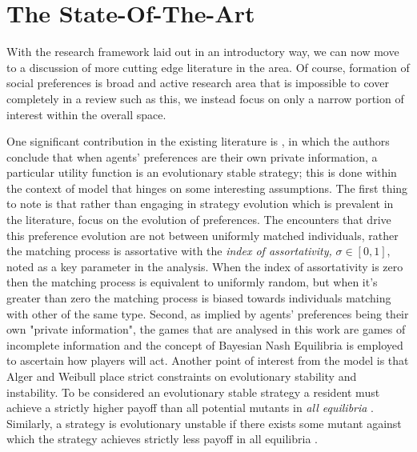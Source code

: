 \documentclass[11pt]{article}
\newcommand*{\np}{\par\noindent\newline}
\begin{document}
\section{The State-Of-The-Art}
With the research framework laid out in an introductory way, we can now move to a discussion of more cutting edge
literature in the area. Of course, formation of social preferences is broad and active research area that is impossible
to cover completely in a review such as this, we instead focus on only a narrow portion of interest within the overall space.

\np One significant contribution in the existing literature is \citet{alger_homo_2013}, in which the authors conclude
that when agents' preferences are their own private information, a particular utility function is an evolutionary stable
strategy; this is done within the context of model that hinges on some interesting assumptions. The first thing to note
is that rather than engaging in strategy evolution which is prevalent in the literature, \citet{alger_homo_2013} focus
on the evolution of preferences. The encounters that drive this preference evolution are not between uniformly matched
individuals, rather the matching process is assortative with the \textit{index of assortativity,} $\sigma \in [0, 1]$,
noted as a key parameter in the analysis. When the index of assortativity is zero then the matching process is
equivalent to uniformly random, but when it's greater than zero the matching process is biased towards individuals
matching with other of the same type. Second, as implied by agents' preferences being their own "private information",
the games that are analysed in this work are games of incomplete information and the concept of Bayesian Nash Equilibria
is employed to ascertain how players will act. Another point of interest from the model is that Alger and Weibull place
strict constraints on evolutionary stability and instability. To be considered an evolutionary stable strategy a
resident must achieve a strictly higher payoff than all potential mutants in \textit{all equilibria} \citep[~p.
2274]{alger_homo_2013}. Similarly, a strategy is evolutionary unstable if there exists some mutant against which the
strategy achieves strictly less payoff in all equilibria \citep[~p. 2275]{alger_homo_2013}.
\end{document}
